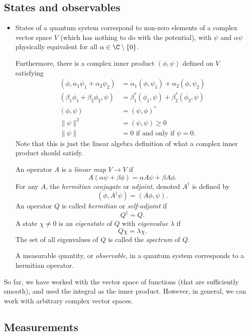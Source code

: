 \documentclass[a4paper]{article}
\begin{document}
\subsection{States and observables}
\begin{itemize}
  \item States of a quantum system correspond to non-zero elements of a complex vector space $V$ (which has nothing to do with the potential), with $\psi$ and $\alpha \psi$ physically equivalent for all $\alpha \in \C\setminus \{0\}$.

    Furthermore, there is a complex inner product $(\phi, \psi)$ defined on $V$ satisfying
    \begin{align*}
      (\phi, \alpha_1 \psi_1 + \alpha_2 \psi_2) &= \alpha_1(\phi, \psi_1) + \alpha_2(\phi, \psi_2)\\
      (\beta_1 \phi_1 + \beta_2 \phi_2, \psi) &= \beta_1^*(\phi_1, \psi) + \beta_2^*(\phi_2, \psi)\\
      (\phi, \psi) &= (\psi, \phi)^*\\
      \|\psi\|^2 &= (\psi, \psi) \geq 0\\
      \|\psi\| &= 0 \text{ if and only if } \psi = 0.
    \end{align*}
    Note that this is just the linear algebra definition of what a complex inner product should satisfy.

    An operator $A$ is a \emph{linear map} $V \to V$ if
    \[
      A(\alpha \psi + \beta \phi) = \alpha A\psi + \beta A\phi.
    \]
    For any $A$, the \emph{hermitian conjugate} or \emph{adjoint}, denoted $A^{\dagger}$ is defined by
    \[
      (\phi, A^{\dagger}\psi) = (A \phi, \psi).
    \]
    An operator $Q$ is called \emph{hermitian} or \emph{self-adjoint} if
    \[
      Q^{\dagger} = Q.
    \]
    A state $\chi \not= 0$ is an \emph{eigenstate} of $Q$ with \emph{eigenvalue} $\lambda$ if
    \[
      Q \chi = \lambda \chi.
    \]
    The set of all eigenvalues of $Q$ is called the \emph{spectrum} of $Q$.

    A measurable quantity, or \emph{observable}, in a quantum system corresponds to a hermitian operator.
\end{itemize}
So far, we have worked with the vector space of functions (that are sufficiently smooth), and used the integral as the inner product. However, in general, we can work with arbitrary complex vector spaces.

\subsection{Measurements}
\end{document}
